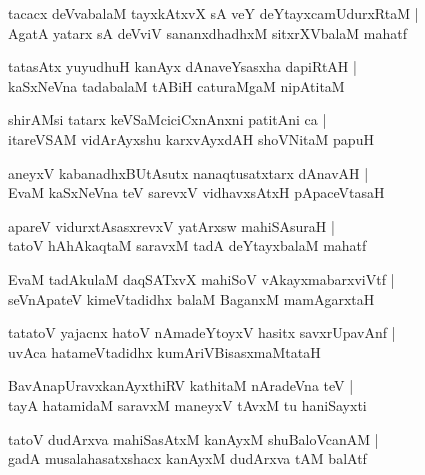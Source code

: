 \begin{shloka}
tacacx deVvabalaM tayxkAtxvX sA veY deYtayxcamUdurxRtaM |\\
AgatA yatarx sA deVviV sananxdhadhxM sitxrXVbalaM mahatf
\end{shloka}

\begin{shloka}
tatasAtx yuyudhuH kanAyx dAnaveYsasxha dapiRtAH |\\
kaSxNeVna tadabalaM tABiH caturaMgaM nipAtitaM 
\end{shloka}

\begin{shloka}
shirAMsi tatarx keVSaMciciCxnAnxni patitAni ca |\\
itareVSAM vidArAyxshu karxvAyxdAH shoVNitaM papuH
\end{shloka}

\begin{shloka}
aneyxV kabanadhxBUtAsutx nanaqtusatxtarx dAnavAH |\\
EvaM kaSxNeVna teV sarevxV vidhavxsAtxH pApaceVtasaH
\end{shloka}

\begin{shloka}
apareV vidurxtAsasxrevxV yatArxsw mahiSAsuraH |\\
tatoV hAhAkaqtaM saravxM tadA deYtayxbalaM mahatf
\end{shloka}

\begin{shloka}
EvaM tadAkulaM daqSATxvX mahiSoV vAkayxmabarxviVtf |\\
seVnApateV kimeVtadidhx balaM BaganxM mamAgarxtaH 
\end{shloka}

\begin{shloka}
tatatoV yajacnx hatoV nAmadeYtoyxV hasitx savxrUpavAnf |\\
uvAca hatameVtadidhx kumAriVBisasxmaMtataH 
\end{shloka}

\begin{shloka}
BavAnapUravxkanAyxthiRV kathitaM nAradeVna teV |\\
tayA hatamidaM saravxM maneyxV tAvxM tu haniSayxti 
\end{shloka}

\begin{shloka}
tatoV dudArxva mahiSasAtxM kanAyxM shuBaloVcanAM |\\
gadA musalahasatxshacx kanAyxM dudArxva tAM balAtf 
\end{shloka}

